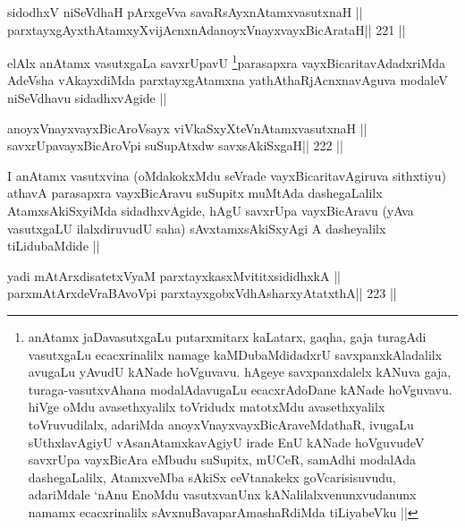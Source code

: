 \begin{shl}
sidodhxV niSeVdhaH pArxgeVva savaRsAyxnAtamxvasutxnaH ||
parxtayxgAyxthAtamxyXvijAcnxnAdanoyxVnayxvayxBicArataH\hfill || 221 ||
\end{shl}

\begin{artha}
elAlx anAtamx vasutxgaLa savxrUpavU \footnote[1]{anAtamx
  jaDavasutxgaLu putarxmitarx kaLatarx, gaqha, gaja turagAdi vasutxgaLu
  ecacxrinalilx namage kaMDubaMdidadxrU savxpanxkAladalilx avugaLu
  yAvudU kANade hoVguvavu. hAgeye savxpanxdalelx kANuva gaja,
  turaga-vasutxvAhana modalAdavugaLu ecacxrAdoDane kANade hoVguvavu.
  hiVge oMdu avasethxyalilx toVridudx matotxMdu avasethxyalilx
  toVruvudilalx, adariMda anoyxVnayxvayxBicAraveMdathaR,
  ivugaLu sUthxlavAgiyU vAsanAtamxkavAgiyU irade EnU kANade hoVguvudeV
  savxrUpa vayxBicAra eMbudu suSupitx, mUCeR, samAdhi modalAda
  dashegaLalilx, AtamxveMba sAkiSx ceVtanakekx goVcarisisuvudu,
  adariMdale `nAnu EnoMdu vasutxvanUnx kANalilalxvenunxvudanunx namamx
  ecacxrinalilx sAvxnuBavaparAmashaRdiMda tiLiyabeVku ||}parasapxra
vayxBicaritavAdadxriMda AdeVsha vAkayxdiMda parxtayxgAtamxna
yathAthaRjAcnxnavAguva modaleV niSeVdhavu sidadhxvAgide ||
\end{artha}


\begin{shl}
\footnotemark[1]anoyxVnayxvayxBicAroV\s sayx viVkaSxyXteV\s nAtamxvasutxnaH ||
\footnotemark[2]savxrUpavayxBicAroV\s pi suSupAtxdw savxsAkiSxgaH\hfill || 222 ||
\end{shl}

\begin{artha}
I anAtamx vasutxvina (oMdakokxMdu seVrade vayxBicaritavAgiruva
sithxtiyu) athavA parasapxra vayxBicAravu suSupitx muMtAda
dashegaLalilx AtamxsAkiSxyiMda sidadhxvAgide, hAgU savxrUpa
vayxBicAravu (yAva vasutxgaLU ilalxdiruvudU saha) sAvxtamxsAkiSxyAgi
A dasheyalilx tiLidubaMdide ||
\end{artha}

\begin{shl}
yadi mAtArxdisatetxVyaM parxtayxkasxMvititxsididhxkA ||
parxmAtArxdeVraBAvoV\s pi parxtayxgobxVdhAsharxyAtatxthA\hfill || 223 ||
\end{shl}

